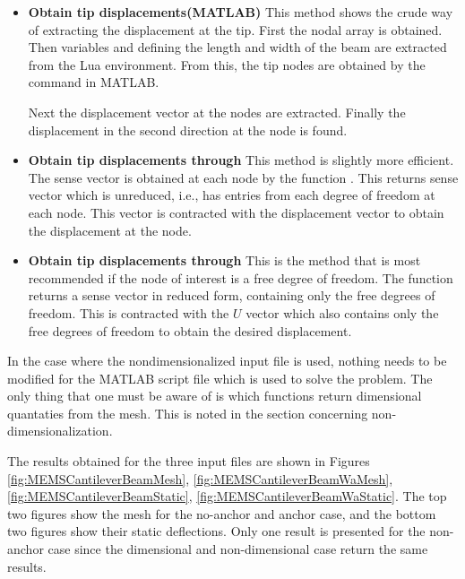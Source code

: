 \begin{itemize}

  \item{\textbf{Obtain tip displacements(MATLAB)}}
  This method shows the crude way of extracting the displacement
  at the tip. First the nodal array is obtained. Then variables
   and  defining the length and width of the beam 
  are extracted from the Lua environment. From this, the tip nodes 
  are obtained by the  command in MATLAB.

  Next the displacement vector at the nodes are extracted. Finally 
  the displacement in the second direction at the node is found.

  \item{\textbf{Obtain tip displacements through 
                                    }}
  This method is slightly more efficient. The sense vector is obtained 
  at each node by the function . This 
  returns sense vector which is unreduced, i.e., has entries from each 
  degree of freedom at each node. This vector is contracted with the 
  displacement vector to obtain the displacement at the node.

  \item{\textbf{Obtain tip displacements through }}
  This is the method that is most recommended if the node of interest 
  is a free degree of freedom.  The function  
  returns a sense vector in reduced form, containing only the free 
  degrees of freedom. This is contracted with the $U$ vector which also 
  contains only the free degrees of freedom to obtain the desired 
  displacement.

\end{itemize}

In the case where the nondimensionalized input file is used, nothing 
needs to be modified for the MATLAB script file which is used to solve 
the problem. The only thing that one must be aware of is which functions 
return dimensional quantaties from the mesh. This is noted in the 
section concerning non-dimensionalization.

The results obtained for the three input files are shown in 
Figures 
\ref{fig:MEMSCantileverBeamMesh},
\ref{fig:MEMSCantileverBeamWaMesh},
\ref{fig:MEMSCantileverBeamStatic},
\ref{fig:MEMSCantileverBeamWaStatic}.
The top two figures show the mesh for the no-anchor and anchor
case, and the bottom two figures show their static deflections.
Only one result is presented for the non-anchor case since
the dimensional and non-dimensional case return the same 
results. 

